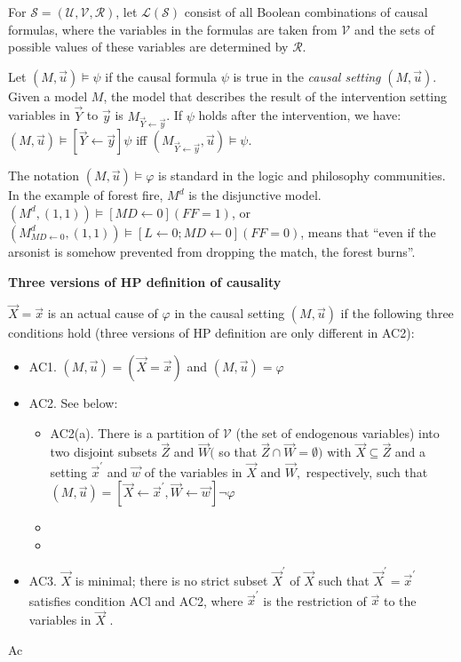 \documentclass{article}
\begin{document}
For $\mathcal{S}=(\mathcal{U}, \mathcal{V}, \mathcal{R})$, let $\mathcal{L}(\mathcal{S})$ consist of all Boolean combinations of causal formulas, where the variables in the formulas are taken from $\mathcal{V}$ and the sets of possible values of these variables are determined by $\mathcal{R}$.

Let $(M, \vec{u}) \models \psi$ if the causal formula $\psi$ is true in the \textit{causal setting} $(M, \vec{u})$. Given a model $M$, the model that describes the result of the intervention setting variables in $\vec{Y}$ to $\vec{y}$ is $M_{\vec{Y} \leftarrow \vec{y}}$. If $\psi$ holds after the intervention, we have: $(M, \vec{u})\models[\vec{Y} \leftarrow \vec{y}] \psi$ iff $(M_{\vec{Y} \leftarrow \vec{y}}, \vec{u})\models\psi$.

The notation $(M, \vec{u}) \models \varphi$ is standard in the logic and philosophy communities. In the example of forest fire, $M^{d}$ is the disjunctive model. $\left(M^{d},(1,1)\right) \models [MD \leftarrow 0](FF=1)$, or $\left(M_{M D \leftarrow 0}^{d},(1,1)\right) \models [L \leftarrow 0 ; M D \leftarrow 0](F F=0)$, means that ``even if the arsonist is somehow prevented from dropping the match, the forest burns''.

\begin{mdframed}
\textbf{Three versions of HP definition of causality}
	
	$\vec{X}=\vec{x}$ is an actual cause of $\varphi$ in the causal setting $(M, \vec{u})$ if the following three conditions hold (three versions of HP definition are only different in AC2):

	\begin{itemize}
		\item AC1. $(M, \vec{u})=(\vec{X}=\vec{x})$ and $(M, \vec{u})=\varphi$
		\item AC2. See below:
		\begin{itemize}
		\item AC2(a). There is a partition of $\mathcal{V}$ (the set of endogenous variables) into two disjoint subsets $\vec{Z}$ and $\vec{W}($ so that $\vec{Z} \cap \vec{W}=\emptyset)$ with $\vec{X} \subseteq \vec{Z}$ and a setting $\vec{x}^{\prime}$ and $\vec{w}$ of the variables in $\vec{X}$ and $\vec{W},$ respectively, such that $(M, \vec{u})=\left[\vec{X} \leftarrow \vec{x}^{\prime}, \vec{W} \leftarrow \vec{w}\right] \neg \varphi$
		\item
		\item
		\end{itemize}
		\item AC3. $\vec{X}$ is minimal; there is no strict subset $\vec{X}^{\prime}$ of $\vec{X}$ such that $\vec{X}^{\prime}=\vec{x}^{\prime}$ satisfies condition
		ACl and AC2, where $\vec{x}^{\prime}$ is the restriction of $\vec{x}$ to the variables in $\vec{X}$ .
	\end{itemize}

Ac
	
\end{mdframed}
\end{document}
